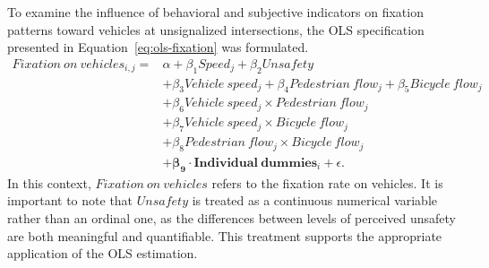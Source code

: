 \documentclass[3p,authoryear]{elsarticle}
\begin{document}
To examine the influence of behavioral and subjective indicators on fixation
patterns toward vehicles at unsignalized intersections, the OLS specification
presented in Equation~\eqref{eq:ols-fixation} was formulated.
%
\begin{equation}\label{eq:ols-fixation}
  \begin{aligned}
    Fixation\ on\ vehicles_{i,j} ={}&
        \alpha + \beta_1 Speed_j + \beta_2 Unsafety\\
      & + \beta_3 Vehicle\ speed_j + \beta_4 Pedestrian\ flow_j
        + \beta_5 Bicycle\ flow_j\\
      & + \beta_6 Vehicle\ speed_j \times Pedestrian\ flow_j\\
      & + \beta_7 Vehicle\ speed_j \times Bicycle\ flow_j\\
      & + \beta_8 Pedestrian\ flow_j \times Bicycle\ flow_j\\
      & + \bm{\beta_9} \cdot
          \bm{Individual\ dummies}_i + \epsilon .
  \end{aligned}
\end{equation}
%
In this context, $Fixation\ on\ vehicles$ refers to the fixation rate on
vehicles. It is important to note that $Unsafety$ is treated as a continuous
numerical variable rather than an ordinal one, as the differences between levels
of perceived unsafety are both meaningful and quantifiable. This treatment
supports the appropriate application of the OLS estimation.
\end{document}
